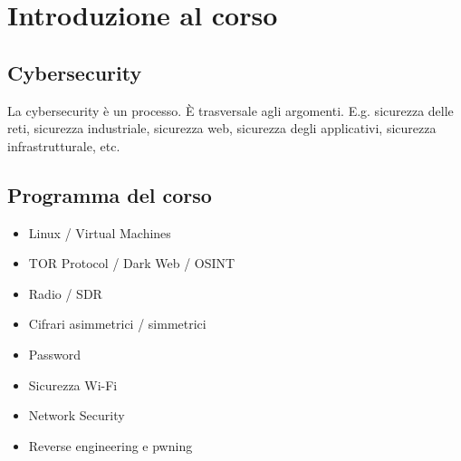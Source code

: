 \chapter{Introduzione al corso}

\section{Cybersecurity}
La cybersecurity è un processo. È trasversale agli argomenti.
E.g. sicurezza delle reti, sicurezza industriale, sicurezza web, sicurezza degli applicativi,
sicurezza infrastrutturale, etc.

\section{Programma del corso}
\begin{itemize}
    \item Linux / Virtual Machines
    \item TOR Protocol / Dark Web / OSINT
    \item Radio / SDR
    \item Cifrari asimmetrici / simmetrici
    \item Password
    \item Sicurezza Wi-Fi
    \item Network Security
    \item Reverse engineering e pwning
\end{itemize}

